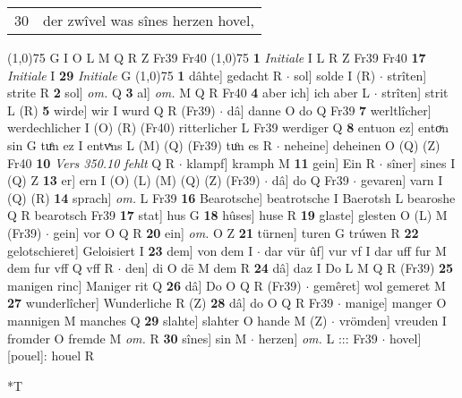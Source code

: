 \documentclass[8pt,a4paper,notitlepage]{article}
\begin{document}
\begin{table}[ht]
\begin{minipage}[t]{0.5\linewidth}
\begin{tabular}{rl}
30 & der zwîvel was sînes herzen hovel,\\ 
\end{tabular}
\scriptsize
\line(1,0){75} \newline
G I O L M Q R Z Fr39 Fr40 \newline
\line(1,0){75} \newline
\textbf{1} \textit{Initiale} I L R Z Fr39 Fr40  \textbf{17} \textit{Initiale} I  \textbf{29} \textit{Initiale} G  \newline
\line(1,0){75} \newline
\textbf{1} dâhte] gedacht R  $\cdot$ sol] solde I (R)  $\cdot$ strîten] strite R \textbf{2} sol] \textit{om.} Q \textbf{3} al] \textit{om.} M Q R Fr40 \textbf{4} aber ich] ich aber L  $\cdot$ strîten] strit L (R) \textbf{5} wirde] wir I wurd Q R (Fr39)  $\cdot$ dâ] danne O do Q Fr39 \textbf{7} werltlîcher] werdechlicher I (O) (R) (Fr40) ritterlicher L Fr39 werdiger Q \textbf{8} entuon ez] entoͮn sin G tuͤn ez I entvͯns L (M) (Q) (Fr39) tuͦn es R  $\cdot$ neheine] deheinen O (Q) (Z) Fr40 \textbf{10} \textit{Vers 350.10 fehlt} Q R   $\cdot$ klampf] kramph M \textbf{11} gein] Ein R  $\cdot$ sîner] sines I (Q) Z \textbf{13} er] ern I (O) (L) (M) (Q) (Z) (Fr39)  $\cdot$ dâ] do Q Fr39  $\cdot$ gevaren] varn I (Q) (R) \textbf{14} sprach] \textit{om.} L Fr39 \textbf{16} Bearotsche] beatrotsche I Baerotsh L bearoshe Q R bearotsch Fr39 \textbf{17} stat] hus G \textbf{18} hûses] huse R \textbf{19} glaste] glesten O (L) M (Fr39)  $\cdot$ gein] vor O Q R \textbf{20} ein] \textit{om.} O Z \textbf{21} türnen] turen G trúwen R \textbf{22} gelotschieret] Geloisiert I \textbf{23} dem] von dem I  $\cdot$ dar vür ûf] vur vf I dar uff fur M dem fur vff Q vff R  $\cdot$ den] di O dē M dem R \textbf{24} dâ] daz I Do L M Q R (Fr39) \textbf{25} manigen rinc] Maniger rit Q \textbf{26} dâ] Do O Q R (Fr39)  $\cdot$ gemêret] wol gemeret M \textbf{27} wunderlîcher] Wunderliche R (Z) \textbf{28} dâ] do O Q R Fr39  $\cdot$ manige] manger O mannigen M manches Q \textbf{29} slahte] slahter O hande M (Z)  $\cdot$ vrömden] vreuden I fromder O fremde M \textit{om.} R \textbf{30} sînes] sin M  $\cdot$ herzen] \textit{om.} L ::: Fr39  $\cdot$ hovel] [pouel]: houel R \newline
\end{minipage}
\hspace{0.5cm}
\begin{minipage}[t]{0.5\linewidth}
\small
\begin{center}*T
\end{center}
\begin{tabular}{rl}

\end{tabular}
\end{minipage}
\end{table}
\end{document}
